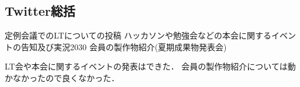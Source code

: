\subsection*{Twitter総括}

定例会議でのLTについての投稿
ハッカソンや勉強会などの本会に関するイベントの告知及び実況2030
会員の製作物紹介(夏期成果物発表会) 

LT会や本会に関するイベントの発表はできた．
会員の製作物紹介については動かなかったので良くなかった．
